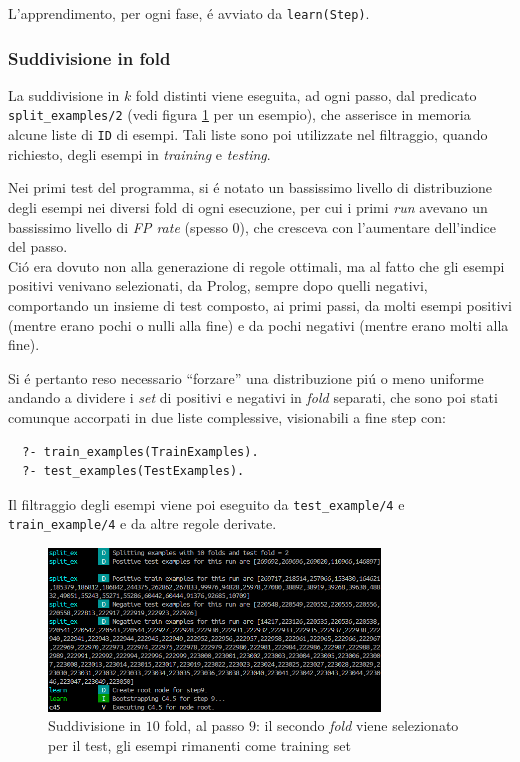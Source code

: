 \documentclass[preprint]{acm_proc_article-sp}
\begin{document}
L'apprendimento, per ogni fase, \'e avviato da \verb|learn(Step)|.

\subsubsection{Suddivisione in fold}
La suddivisione in $k$ fold distinti viene eseguita, ad ogni passo, dal predicato \verb|split_examples/2| (vedi figura \ref{fig:prolog-k-fold} per un esempio), che asserisce in memoria alcune liste di \verb|ID| di esempi. Tali liste sono poi utilizzate nel filtraggio, quando richiesto, degli esempi in \textit{training} e \textit{testing}.

Nei primi test del programma, si \'e notato un bassissimo livello di distribuzione degli esempi nei diversi fold di ogni esecuzione, per cui i primi \textit{run} avevano un bassissimo livello di \textit{FP rate} (spesso $0$), che cresceva con l'aumentare dell'indice del passo.\\
Ci\'o era dovuto non alla generazione di regole ottimali, ma al fatto che gli esempi positivi venivano selezionati, da Prolog, sempre dopo quelli negativi, comportando un insieme di test composto, ai primi passi, da molti esempi positivi (mentre erano pochi o nulli alla fine) e da pochi negativi (mentre erano molti alla fine).

Si \'e pertanto reso necessario ``forzare'' una distribuzione pi\'u o meno uniforme andando a dividere i \textit{set} di positivi e negativi in \textit{fold} separati, che sono poi stati comunque accorpati in due liste complessive, visionabili a fine step con:
\begin{verbatim}
  ?- train_examples(TrainExamples).
  ?- test_examples(TestExamples).
\end{verbatim}

Il filtraggio degli esempi viene poi eseguito da \verb|test_example/4| e \verb|train_example/4| e da altre regole derivate.

\begin{figure}[!htb]
\centering
\includegraphics[width=250pt]{figures/prolog-k-fold.png}
\caption{Suddivisione in $10$ fold, al passo $9$: il secondo \textit{fold} viene selezionato per il test, gli esempi rimanenti come training set}
\label{fig:prolog-k-fold}
\end{figure}
\end{document}
